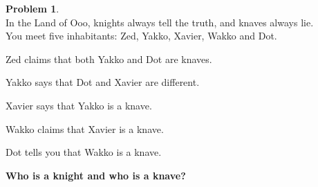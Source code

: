 \documentclass{article}
\theoremstyle{definition}
\newtheorem{problem}{Problem}
\newtheorem*{solution}{Solution}
\begin{document}

\begin{problem}\ \\
In the Land of Ooo, knights always tell the truth, and knaves always lie.\\
You meet five inhabitants: Zed, Yakko, Xavier, Wakko and Dot.  
\begin{compactenum}
\item Zed claims that both Yakko and Dot are knaves.
\item Yakko says that Dot and Xavier are different.
\item Xavier says that Yakko is a knave.
\item Wakko claims that Xavier is a knave.
\item Dot tells you that Wakko is a knave.
\end{compactenum}
\textbf{Who is a knight and who is a knave?}
\end{problem}

\end{document}
